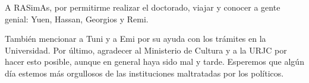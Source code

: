 A RASimAs, por permitirme realizar el doctorado, viajar y conocer a gente genial: Yuen, Hassan, Georgios y Remi. 

También mencionar a Tuni y a Emi por su ayuda con los trámites en la Universidad.
Por último, agradecer al Ministerio de Cultura y a la URJC por hacer esto posible, aunque en general haya sido mal y tarde. Esperemos que algún día estemos más orgullosos de las instituciones maltratadas por los políticos.


\cleardoublepage







